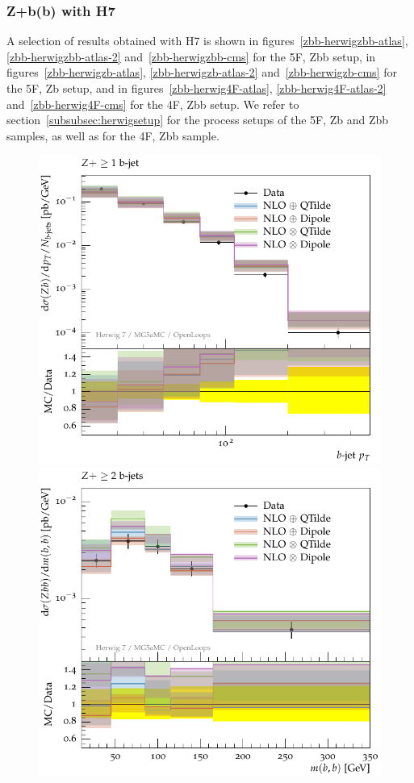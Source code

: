 \documentclass[11pt]{cernrep}
\newcommand{\Herwig}{H\protect\scalebox{0.8}{ERWIG}7\xspace}
\begin{document}
\subsubsection*{Z+b(b) with \Herwig}
\label{sec:ZHerwig}

A selection of results obtained with \Herwig is shown in
figures~\ref{zbb-herwigzbb-atlas}, \ref{zbb-herwigzbb-atlas-2}
and~\ref{zbb-herwigzbb-cms} for the 5F, Zbb setup,
in figures~\ref{zbb-herwigzb-atlas}, 
\ref{zbb-herwigzb-atlas-2} and~\ref{zbb-herwigzb-cms} for the 5F, Zb
setup,
and in figures~\ref{zbb-herwig4F-atlas}, 
\ref{zbb-herwig4F-atlas-2} and~\ref{zbb-herwig4F-cms} for the 4F,
Zbb setup.
We refer to section~\ref{subsubsec:herwigsetup} for the process setups of
the 5F, Zb and Zbb samples, as well as for the 4F, Zbb sample.

\begin{figure}[tbp]
\begin{center}
   \includegraphics[scale=0.65]{figs/zbb/herwigzbb/atlas-d03-x01-y01.pdf}
   \includegraphics[scale=0.65]{figs/zbb/herwigzbb/atlas-d23-x01-y01.pdf} \\

\end{center}
\end{figure}
\end{document}
